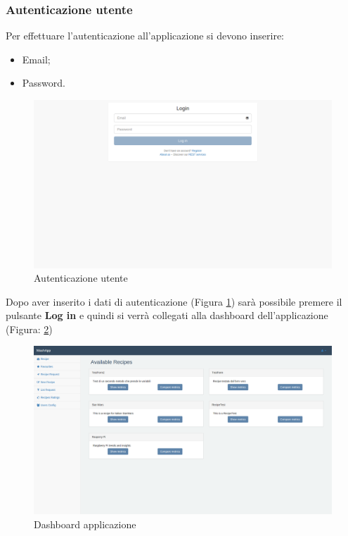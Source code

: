 		\subsubsection{Autenticazione utente} %
		\label{sec:autenticazione_utente}
			Per effettuare l'autenticazione all'applicazione si devono inserire:
			\begin{itemize}
				\item Email;
				\item Password.
			\end{itemize}
			\begin{figure}[htbp]
				\centering
				\centerline{\includegraphics[width=14cm]{images/autenticazione_utente.png}}
				\caption{Autenticazione utente}
				\label{fig:registrazione_utente_accesso}
			\end{figure}
			Dopo aver inserito i dati di autenticazione (Figura \ref{fig:registrazione_utente_accesso}) sarà possibile premere il pulsante \textbf{Log in} e quindi si verrà collegati alla dashboard dell'applicazione (Figura: \ref{fig:dashboard})
			\begin{figure}[htbp]
				\centering
				\centerline{\includegraphics[width=14cm]{images/dashboard.png}}
				\caption{Dashboard applicazione}
				\label{fig:dashboard}
			\end{figure}



